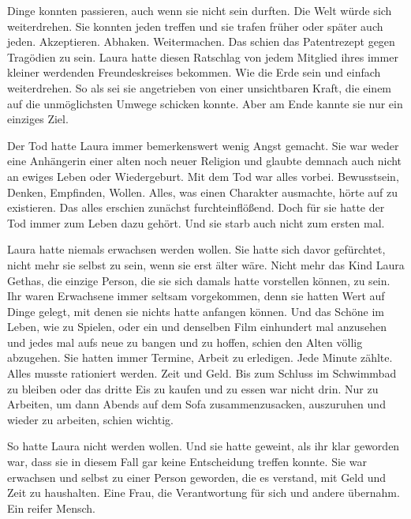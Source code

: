 \par

Dinge konnten passieren, auch wenn sie nicht sein durften.
Die Welt würde sich weiterdrehen.
Sie konnten jeden treffen und sie trafen früher oder später auch jeden.
Akzeptieren.
Abhaken.
Weitermachen.
Das schien das Patentrezept gegen Tragödien zu sein.
Laura hatte diesen Ratschlag von jedem Mitglied ihres immer kleiner werdenden Freundeskreises bekommen.
Wie die Erde sein und einfach weiterdrehen.
So als sei sie angetrieben von einer unsichtbaren Kraft, die einem auf die unmöglichsten Umwege schicken konnte.
Aber am Ende kannte sie nur ein einziges Ziel.

\par

Der Tod hatte Laura immer bemerkenswert wenig Angst gemacht.
Sie war weder eine Anhängerin einer alten noch neuer Religion und glaubte demnach auch nicht an ewiges Leben oder Wiedergeburt.
Mit dem Tod war alles vorbei.
Bewusstsein, Denken, Empfinden, Wollen.
Alles, was einen Charakter ausmachte, hörte auf zu existieren.
Das alles erschien zunächst furchteinflößend.
Doch für sie hatte der Tod immer zum Leben dazu gehört.
Und sie starb auch nicht zum ersten mal.

\par

Laura hatte niemals erwachsen werden wollen.
Sie hatte sich davor gefürchtet, nicht mehr sie selbst zu sein, wenn sie erst älter wäre.
Nicht mehr das Kind Laura Gethas, die einzige Person, die sie sich damals hatte vorstellen können, zu sein.
Ihr waren Erwachsene immer seltsam vorgekommen, denn sie hatten Wert auf Dinge gelegt, mit denen sie nichts hatte anfangen können.
Und das Schöne im Leben, wie zu Spielen, oder ein und denselben Film einhundert mal anzusehen und jedes mal aufs neue zu bangen und zu hoffen, schien den Alten völlig abzugehen.
Sie hatten immer Termine, Arbeit zu erledigen.
Jede Minute zählte.
Alles musste rationiert werden.
Zeit und Geld.
Bis zum Schluss im Schwimmbad zu bleiben oder das dritte Eis zu kaufen und zu essen war nicht drin.
Nur zu Arbeiten, um dann Abends auf dem Sofa zusammenzusacken, auszuruhen und wieder zu arbeiten, schien wichtig.

\par

So hatte Laura nicht werden wollen.
Und sie hatte geweint, als ihr klar geworden war, dass sie in diesem Fall gar keine Entscheidung treffen konnte.
Sie war erwachsen und selbst zu einer Person geworden, die es verstand, mit Geld und Zeit zu haushalten.
Eine Frau, die Verantwortung für sich und andere übernahm.
Ein reifer Mensch.

